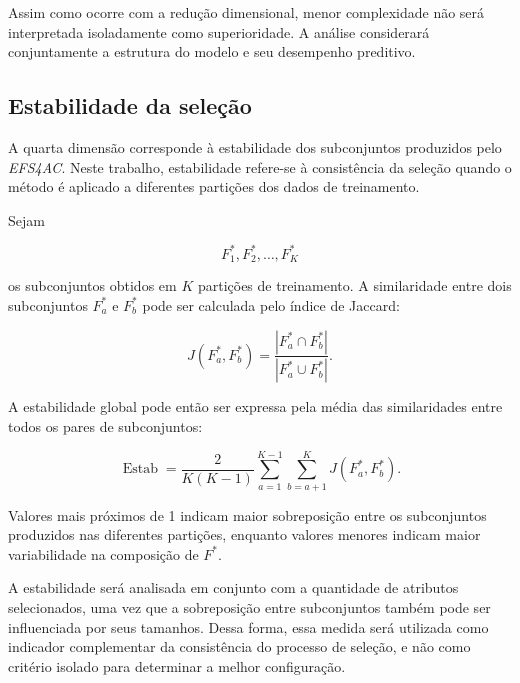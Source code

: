 Assim como ocorre com a redução dimensional, menor complexidade não será
interpretada isoladamente como superioridade. A análise considerará
conjuntamente a estrutura do modelo e seu desempenho preditivo.


\subsection{Estabilidade da seleção}
\label{subsec:ac-efs-avaliacao-estabilidade}

A quarta dimensão corresponde à estabilidade dos subconjuntos produzidos pelo
\textit{EFS4AC}. Neste trabalho, estabilidade refere-se à consistência da
seleção quando o método é aplicado a diferentes partições dos dados de
treinamento.

Sejam

\begin{equation}
    F^{*}_{1},F^{*}_{2},\ldots,F^{*}_{K}
\end{equation}

os subconjuntos obtidos em $K$ partições de treinamento. A similaridade entre
dois subconjuntos $F^{*}_{a}$ e $F^{*}_{b}$ pode ser calculada pelo índice de
Jaccard:

\begin{equation}
    J
    \left(
        F^{*}_{a},F^{*}_{b}
    \right)
    =
    \frac{
        |F^{*}_{a}\cap F^{*}_{b}|
    }{
        |F^{*}_{a}\cup F^{*}_{b}|
    }.
    \label{eq:jaccard-estabilidade-ac-efs}
\end{equation}

A estabilidade global pode então ser expressa pela média das similaridades
entre todos os pares de subconjuntos:

\begin{equation}
    \operatorname{Estab}
    =
    \frac{2}{K(K-1)}
    \sum_{a=1}^{K-1}
    \sum_{b=a+1}^{K}
    J
    \left(
        F^{*}_{a},F^{*}_{b}
    \right).
    \label{eq:estabilidade-media-ac-efs}
\end{equation}

Valores mais próximos de 1 indicam maior sobreposição entre os subconjuntos
produzidos nas diferentes partições, enquanto valores menores indicam maior
variabilidade na composição de $F^{*}$.

A estabilidade será analisada em conjunto com a quantidade de atributos
selecionados, uma vez que a sobreposição entre subconjuntos também pode ser
influenciada por seus tamanhos. Dessa forma, essa medida será utilizada como
indicador complementar da consistência do processo de seleção, e não como
critério isolado para determinar a melhor configuração.


